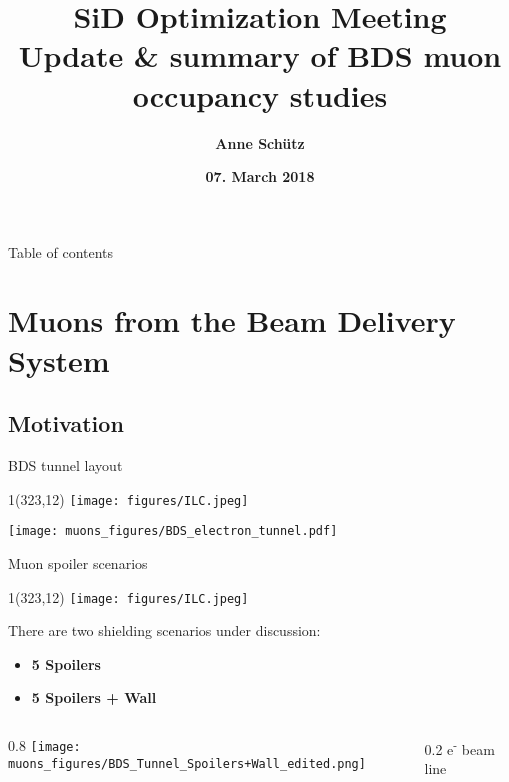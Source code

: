 \documentclass[xcolor={dvipsnames}]{beamer}
\title[ILC backgrounds \& SiD Occupancy]{\textbf{\alert{SiD Optimization Meeting} \\ \vspace*{0.3cm} \LARGE  Update \& summary of BDS muon occupancy studies}}
\author{\textbf{Anne Sch\"utz}}
\institute{\textbf{DESY}}
\date{\textbf{07. March 2018}}
\newcommand{\ilclogo}{
  \setlength{\TPHorizModule}{1pt}
  \setlength{\TPVertModule}{1pt}
  \begin{textblock}{1}(323,12)
   \texttt{[image: figures/ILC.jpeg]}
  \end{textblock}
}
\begin{document}
{
\begin{frame}
  \titlepage
\end{frame}
}
\setcounter{tocdepth}{2}
\begin{frame}{Table of contents}
  \tableofcontents
\end{frame}





\section{Muons from the Beam Delivery System}
\subsection{Motivation}

\begin{frame}{BDS tunnel layout}
\ilclogo
\begin{center}
\texttt{[image: muons\_figures/BDS\_electron\_tunnel.pdf]}
\end{center}
\end{frame}

\begin{frame}{Muon spoiler scenarios}
\ilclogo
There are two shielding scenarios under discussion:
\begin{itemize}
 \item \textbf{5 Spoilers}
 \item \textbf{5 Spoilers + Wall}
\end{itemize}

\begin{columns}[b]
 \begin{column}{0.8\textwidth}
 \flushright
\texttt{[image: muons\_figures/BDS\_Tunnel\_Spoilers+Wall\_edited.png]}
\end{column}
 \begin{column}{0.2\textwidth}
 \flushleft
e\textsuperscript{-} beam line
\vspace*{0.55cm}
\end{column}
\end{columns}
\end{frame}
\end{document}
